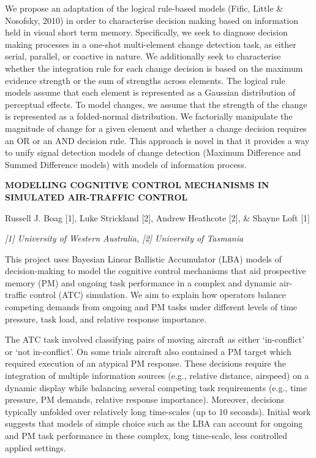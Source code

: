 \documentclass[]{article}
\begin{document}
We propose an adaptation of the logical rule-based models (Fific, Little
\& Nosofsky, 2010) in order to characterise decision making based on
information held in visual short term memory. Specifically, we seek to
diagnose decision making processes in a one-shot multi-element change
detection task, as either serial, parallel, or coactive in nature. We
additionally seek to characterise whether the integration rule for each
change decision is based on the maximum evidence strength or the sum of
strengths across elements. The logical rule models assume that each
element is represented as a Gaussian distribution of perceptual effects.
To model changes, we assume that the strength of the change is
represented as a folded-normal distribution. We factorially manipulate
the magnitude of change for a given element and whether a change
decision requires an OR or an AND decision rule. This approach is novel
in that it provides a way to unify signal detection models of change
detection (Maximum Difference and Summed Difference models) with models
of information process.

\textbf{MODELLING COGNITIVE CONTROL MECHANISMS IN SIMULATED AIR-TRAFFIC
CONTROL}

Russell J. Boag {[}1{]}, Luke Strickland {[}2{]}, Andrew Heathcote
{[}2{]}, \& Shayne Loft {[}1{]}

\emph{{[}1{]} University of Western Australia, {[}2{]} University of
Tasmania}

This project uses Bayesian Linear Ballistic Accumulator (LBA) models of
decision-making to model the cognitive control mechanisms that aid
prospective memory (PM) and ongoing task performance in a complex and
dynamic air-traffic control (ATC) simulation. We aim to explain how
operators balance competing demands from ongoing and PM tasks under
different levels of time pressure, task load, and relative response
importance.

The ATC task involved classifying pairs of moving aircraft as either
`in-conflict' or `not in-conflict'. On some trials aircraft also
contained a PM target which required execution of an atypical PM
response. These decisions require the integration of multiple
information sources (e.g., relative distance, airspeed) on a dynamic
display while balancing several competing task requirements (e.g., time
pressure, PM demands, relative response importance). Moreover, decisions
typically unfolded over relatively long time-scales (up to 10 seconds).
Initial work suggests that models of simple choice such as the LBA can
account for ongoing and PM task performance in these complex, long
time-scale, less controlled applied settings.
\end{document}
